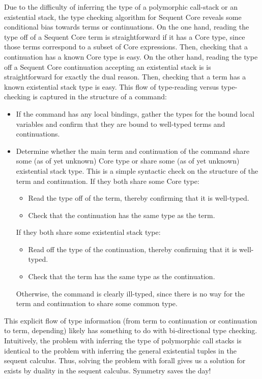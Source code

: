 \documentclass{article}
\begin{document}
Due to the difficulty of inferring the type of a polymorphic call-stack or an
existential stack, the type checking algorithm for Sequent Core reveals some
conditional bias towards terms or continuations.  On the one hand, reading the
type off of a Sequent Core term is straightforward if it has a Core type, since
those terms correspond to a subset of Core expressions.  Then, checking that a
continuation has a known Core type is easy.  On the other hand, reading the type
off a Sequent Core continuation accepting an existential stack is is
straightforward for exactly the dual reason.  Then, checking that a term has a
known existential stack type is easy. This flow of type-reading versus
type-checking is captured in the structure of a command:
\begin{itemize}
\item If the command has any local bindings, gather the types for the bound
  local variables and confirm that they are bound to well-typed terms and
  continuations.
\item Determine whether the main term and continuation of the command share some
  (as of yet unknown) Core type or share some (as of yet unknown) existential
  stack type.  This is a simple syntactic check on the structure of the term and
  continuation.  If they both share some Core type:
  \begin{itemize}
  \item Read the type off of the term, thereby confirming that it is well-typed.
  \item Check that the continuation has the same type as the term.
  \end{itemize}
  If they both share some existential stack type:
  \begin{itemize}
  \item Read off the type of the continuation, thereby confirming that it is
    well-typed.
  \item Check that the term has the same type as the continuation.
  \end{itemize}
  Otherwise, the command is clearly ill-typed, since there is no way for the
  term and continuation to share some common type.
\end{itemize}
This explicit flow of type information (from term to continuation or
continuation to term, depending) likely has something to do with bi-directional
type checking.  Intuitively, the problem with inferring the type of polymorphic
call stacks is identical to the problem with inferring the general existential
tuples in the sequent calculus.  Thus, solving the problem with forall gives us
a solution for exists by duality in the sequent calculus.  Symmetry saves the
day!
\end{document}
